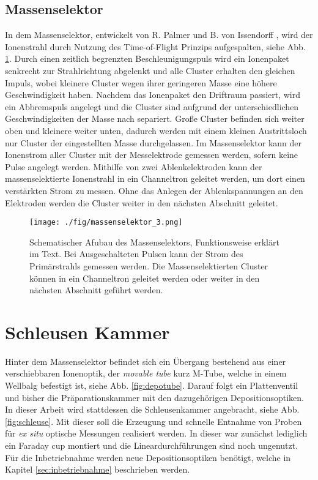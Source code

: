 \subsection{Massenselektor}
In dem Massenselektor, entwickelt von R. Palmer und B. von Issendorff \cite{Issendorff.1999}, wird der Ionenstrahl durch Nutzung des Time-of-Flight Prinzips aufgespalten, siehe Abb. \ref{fig:mschtr}.
Durch einen zeitlich begrenzten Beschleunigungspuls wird ein Ionenpaket senkrecht zur Strahlrichtung abgelenkt und alle Cluster erhalten den gleichen Impuls, wobei kleinere Cluster wegen ihrer geringeren Masse eine höhere Geschwindigkeit haben.
Nachdem das Ionenpaket den Driftraum passiert, wird ein Abbremspuls angelegt und die Cluster sind aufgrund der unterschiedlichen Geschwindigkeiten der Masse nach separiert.
Große Cluster befinden sich weiter oben und kleinere weiter unten, dadurch werden mit einem kleinen Austrittsloch nur Cluster der eingestellten Masse durchgelassen.
Im Massenselektor kann der Ionenstrom aller Cluster mit der Messelektrode gemessen werden, sofern keine Pulse angelegt werden.
Mithilfe von zwei Ablenkelektroden kann der massenselektierte Ionenstrahl in ein Channeltron geleitet werden, um dort einen verstärkten Strom zu messen.
Ohne das Anlegen der Ablenkspannungen an den Elektroden werden die Cluster weiter in den nächsten Abschnitt geleitet.
\begin{figure}
    \centering
    \texttt{[image: ./fig/massenselektor\_3.png]}
    \caption{Schematischer Afubau des Massenselektors, Funktionsweise erklärt im Text. Bei Ausgeschalteten Pulsen kann der Strom des Primärstrahls gemessen werden. Die Massenselektierten Cluster können in ein Channeltron geleitet werden oder weiter in den nächsten Abschnitt geführt werden.}
    \label{fig:mschtr}
\end{figure}

\section{Schleusen Kammer}
\label{sec:schleuse}
Hinter dem Massenselektor befindet sich ein Übergang bestehend aus einer verschiebbaren Ionenoptik, der \textit{movable tube} kurz M-Tube, welche in einem Wellbalg befestigt ist, siehe Abb. \ref{fig:depotube}.
Darauf folgt ein Plattenventil und bisher die Präparationskammer mit den dazugehörigen Depositionsoptiken.
In dieser Arbeit wird stattdessen die Schleusenkammer angebracht, siehe Abb. \ref{fig:schleuse}.
Mit dieser soll die Erzeugung und schnelle Entnahme von Proben für \textit{ex situ} optische Messungen realisiert werden.
In dieser war zunächst lediglich ein Faraday cup montiert und die Lineardurchführungen sind noch ungenutzt.
Für die Inbetriebnahme werden neue Depositionsoptiken benötigt, welche in Kapitel \ref{sec:inbetriebnahme} beschrieben werden.

